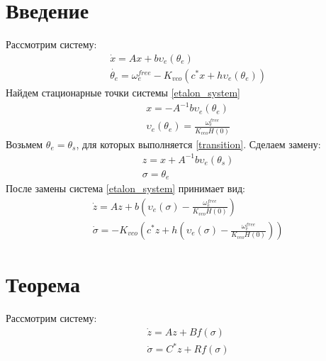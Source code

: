 \documentclass[a4paper]{article}
\begin{document}

\section{Введение}
Рассмотрим систему:
 \begin{equation}\label{etalon_system}
 \begin{aligned}
 &\dot{x} = Ax + b\upsilon_e(\theta_e)\\
 &\dot{\theta_e} = \omega_e^{free} - K_{vco}(c^*x + h\upsilon_e(\theta_e))
 \end{aligned}
\end{equation}
Найдем стационарные точки системы \ref{etalon_system}
 \begin{equation}\label{transition}
 \begin{aligned}
 &x = -A^{-1}b\upsilon_e(\theta_e)\\
 &\upsilon_e(\theta_e) = \frac{\omega_e^{free}}{K_{vco}H(0)}
 \end{aligned}
\end{equation}
Возьмем $\theta_e = \theta_s$, для которых выполняется \ref{transition}. Сделаем замену:
 \begin{equation}\label{replacement1}
 \begin{aligned}
 &z =x + A^{-1}b\upsilon_e(\theta_s)\\
 &\sigma = \theta_e 
 \end{aligned}
\end{equation}
После замены система \ref{etalon_system} принимает вид:
 \begin{equation}\label{etalon_system}
 \begin{aligned}
 &\dot{z} = Az + b(\upsilon_e(\sigma) - \frac{\omega_e^{free}}{K_{vco}H(0)})\\
 &\dot{\sigma} = -K_{vco}(c^*z + h(\upsilon_e(\sigma) - \frac{\omega_e^{free}}{K_{vco}H(0)}))
 \end{aligned}
\end{equation}

\section{Теорема}
Рассмотрим систему:
 \begin{equation}\label{system}
 \begin{aligned}
 &\dot{z} = Az + Bf(\sigma)\\
 &\dot{\sigma} = C^*z + Rf(\sigma)
 \end{aligned}
\end{equation}
\end{document}
